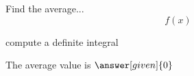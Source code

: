 \documentclass{ximera}
\begin{document}
\begin{problem} %
  Find the average...
  \[
  f(x)
  \]
    \begin{hint}
      compute a definite integral
    \end{hint}
    
		
		The average value is
		 $\answer[given]{0}$
\end{problem}


\begin{center}
\begin{foldable}
\end{foldable}
\end{center}
\end{document}
